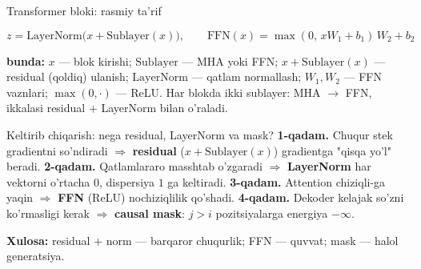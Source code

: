 \documentclass[aspectratio=169,11pt]{beamer}
\newcommand{\bunda}[1]{{\small\textbf{bunda:}\; #1}}
\begin{document}
\begin{frame}{Transformer bloki: rasmiy ta'rif}
  \begin{tcolorbox}[defbox,title={Ta'rif: sublayer, residual va FFN}]
    \vspace{-0.4em}
    $$ z = \mathrm{LayerNorm}\big(x + \mathrm{Sublayer}(x)\big), \qquad
       \mathrm{FFN}(x) = \max(0,\, xW_1 + b_1)\,W_2 + b_2 $$
  \end{tcolorbox}
  \vspace{2pt}
  \bunda{$x$ --- blok kirishi; $\mathrm{Sublayer}$ --- MHA yoki FFN; $x +
  \mathrm{Sublayer}(x)$ --- residual (qoldiq) ulanish; $\mathrm{LayerNorm}$ ---
  qatlam normallash; $W_1,W_2$ --- FFN vaznlari; $\max(0,\cdot)$ --- ReLU.}
  \vspace{4pt}
  \footnotesize Har blokda ikki sublayer: MHA $\to$ FFN, ikkalasi residual $+$
  LayerNorm bilan o'raladi.
\end{frame}

\begin{frame}{Keltirib chiqarish: nega residual, LayerNorm va mask?}
  \textbf{1-qadam.} Chuqur stek gradientni so'ndiradi $\Rightarrow$
  \textbf{residual} ($x+\mathrm{Sublayer}(x)$) gradientga "qisqa yo'l" beradi.
  \pause
  \textbf{2-qadam.} Qatlamlararo masshtab o'zgaradi $\Rightarrow$
  \textbf{LayerNorm} har vektorni o'rtacha $0$, dispersiya $1$ ga keltiradi.
  \pause
  \textbf{3-qadam.} Attention chiziqli-ga yaqin $\Rightarrow$ \textbf{FFN}
  (ReLU) nochiziqlilik qo'shadi.
  \pause
  \textbf{4-qadam.} Dekoder kelajak so'zni ko'rmasligi kerak $\Rightarrow$
  \textbf{causal mask}: $j>i$ pozitsiyalarga energiya $-\infty$.
  \begin{tcolorbox}[okbox,top=2pt,bottom=2pt]
    \small \textbf{Xulosa:} residual $+$ norm --- barqaror chuqurlik; FFN ---
    quvvat; mask --- halol generatsiya.
  \end{tcolorbox}
\end{frame}
\end{document}
